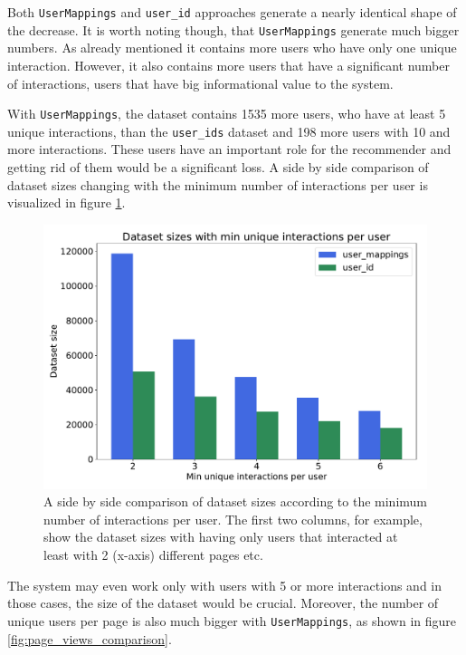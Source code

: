 Both \texttt{UserMappings} and \texttt{user\_id} approaches generate a nearly identical shape of the decrease. It is worth noting though, that \texttt{UserMappings} generate much bigger numbers. As already mentioned it contains more users who have only one unique interaction. However, it also contains more users that have a significant number of interactions, users that have big informational value to the system. 

With \texttt{UserMappings}, the dataset contains 1535 more users, who have at least 5 unique interactions, than the \texttt{user\_ids} dataset and 198 more users with 10 and more interactions. These users have an important role for the recommender and getting rid of them would be a significant loss. A side by side comparison of dataset sizes changing with the minimum number of interactions per user is visualized in figure \ref{side_by_size}.

\begin{figure}[H]
    \centering
    \includegraphics[scale=0.5]{obrazky-figures/min_interaction_sizes.pdf}
    \caption{A side by side comparison of dataset sizes according to the minimum number of interactions per user. The first two columns, for example, show the dataset sizes with having only users that interacted at least with 2 (x-axis) different pages etc.}
    \label{side_by_size}
\end{figure}

The system may even work only with users with 5 or more interactions and in those cases, the size of the dataset would be crucial. Moreover, the number of unique users per page is also much bigger with \texttt{UserMappings}, as shown in figure \ref{fig:page_views_comparison}.

